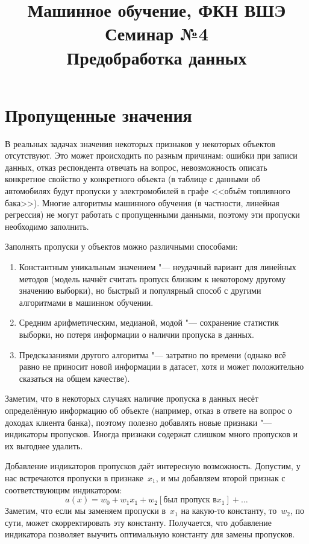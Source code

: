 \documentclass[12pt,fleqn]{article}
\title{Машинное обучение, ФКН ВШЭ\\Семинар №4\\Предобработка данных}
\author{}
\date{}
\begin{document}
\maketitle


\section{Пропущенные значения}

В реальных задачах значения некоторых признаков у некоторых объектов отсутствуют. Это может происходить по разным причинам: ошибки при записи данных, отказ респондента отвечать на вопрос, невозможность описать конкретное свойство у конкретного объекта (в таблице с данными об автомобилях будут пропуски у электромобилей в графе <<объём топливного бака>>). Многие алгоритмы машинного обучения (в частности, линейная регрессия) не могут работать с пропущенными данными, поэтому эти пропуски необходимо заполнить.

Заполнять пропуски у объектов можно различными способами:
\begin{enumerate}
  \item Константным уникальным значением "--- неудачный вариант для линейных методов (модель начнёт считать пропуск близким к некоторому другому значению выборки), но быстрый и популярный способ с другими алгоритмами в машинном обучении.
  \item Средним арифметическим, медианой, модой "--- сохранение статистик выборки, но потеря информации о наличии пропуска в данных.
  \item Предсказаниями другого алгоритма "--- затратно по времени (однако всё равно не приносит новой информации в датасет, хотя и может положительно сказаться на общем качестве).
\end{enumerate}

Заметим, что в некоторых случаях наличие пропуска в данных несёт определённую информацию об объекте (например, отказ в ответе на вопрос о доходах клиента банка), поэтому полезно добавлять новые признаки "--- индикаторы пропусков. Иногда признаки содержат слишком много пропусков и их выгоднее удалить.

Добавление индикаторов пропусков даёт интересную возможность. Допустим, у нас встречаются пропуски в признаке~$x_1$,
и мы добавляем второй признак с соответствующим индикатором:
\[
    a(x)
    =
    w_0
    +
    w_1 x_1
    +
    w_2 [\text{был пропуск в} x_1]
    +
    \dots
\]
Заметим, что если мы заменяем пропуски в~$x_1$ на какую-то константу, то~$w_2$, по сути, может скорректировать эту константу.
Получается, что добавление индикатора позволяет выучить оптимальную константу для замены пропусков.
\end{document}
